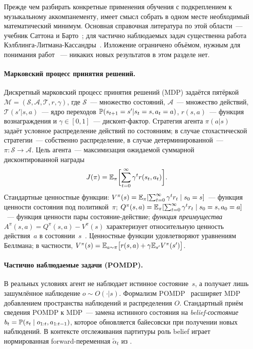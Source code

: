 %
Прежде чем разбирать конкретные применения обучения с
подкреплением к музыкальному аккомпанементу, имеет смысл собрать
в одном месте необходимый математический минимум. Основная
справочная литература по этой области~--- учебник Саттона и
Барто~\cite{SuttonBarto2018}; для частично наблюдаемых задач
существенна работа Кэлблинга-Литмана-Кассандры~\cite{Kaelbling1998POMDP}.
Изложение ограничено объёмом, нужным для понимания работ
\cite{Dorfer2018RL,Jiang2020RLDuet,Peter2023,Wu2024ReaLchords}~---
никаких новых результатов в этом разделе нет.

\paragraph*{Марковский процесс принятия решений.} Дискретный
марковский процесс принятия решений (MDP) задаётся пятёркой
$\mathcal{M}=(\mathcal{S},\mathcal{A},\mathcal{T},r,\gamma)$,
где $\mathcal{S}$~--- множество состояний, $\mathcal{A}$~---
множество действий, $\mathcal{T}(s'|s,a)$~--- ядро переходов
$\mathbb{P}(s_{t+1}=s'|s_t=s,a_t=a)$, $r(s,a)$~--- функция
вознаграждения и $\gamma\in[0,1]$~--- дисконт-фактор. Стратегия
агента $\pi(a|s)$ задаёт условное распределение действий по
состояниям; в случае стохастической стратегии~--- собственно
распределение, в случае детерминированной~---
$\pi:\mathcal{S}\to\mathcal{A}$. Цель агента~--- максимизация
ожидаемой суммарной дисконтированной награды
\begin{equation}
J(\pi) = \Expect_\pi\biggl[\sum_{t=0}^{\infty}\gamma^t r(s_t, a_t)\biggr].
\eqlab{rl-objective}
\end{equation}
Стандартные ценностные функции:
$V^\pi(s) = \mathbb{E}_\pi[\sum_{t=0}^\infty \gamma^t r_t \mid s_0=s]$~---
функция ценности состояния под политикой~$\pi$;
$Q^\pi(s,a) = \mathbb{E}_\pi[\sum_{t=0}^\infty \gamma^t r_t \mid s_0=s,
a_0=a]$~--- функция ценности пары состояние-действие;
\textit{функция преимущества} $A^\pi(s,a)=Q^\pi(s,a)-V^\pi(s)$
характеризует относительную ценность действия~$a$ в
состоянии~$s$~\cite[гл.~3]{SuttonBarto2018}. Ценностные функции
удовлетворяют уравнениям Беллмана; в частности,
$V^\pi(s) = \mathbb{E}_{a\sim\pi}\bigl[r(s,a) +
\gamma\mathbb{E}_{s'}V^\pi(s')\bigr]$.

\paragraph*{Частично наблюдаемые задачи (POMDP).} В реальных
условиях агент не наблюдает истинное состояние~$s$, а получает
лишь зашумлённое наблюдение $o\sim O(\cdot|s)$. Формализм
POMDP~\cite{Kaelbling1998POMDP} расширяет MDP добавлением
пространства наблюдений и распределения $O$. Стандартный приём
сведения POMDP к MDP~--- замена истинного состояния на
\textit{belief-состояние} $b_t = \mathbb{P}(s_t \mid o_{1:t}, a_{1:t-1})$,
которое обновляется байесовски при получении новых
наблюдений. В контексте отслеживания партитуры роль belief
играет нормированная forward-переменная $\tilde\alpha_t$ из
.

